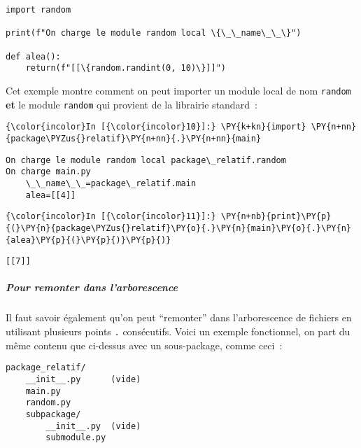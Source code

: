     \begin{Verbatim}[commandchars=\\\{\}]
import random

print(f"On charge le module random local \{\_\_name\_\_\}")

def alea():
    return(f"[[\{random.randint(0, 10)\}]]")

    \end{Verbatim}

    Cet exemple montre comment on peut importer un module local de nom
\texttt{random} \textbf{et} le module \texttt{random} qui provient de la
librairie standard~:

    \begin{Verbatim}[commandchars=\\\{\}]
{\color{incolor}In [{\color{incolor}10}]:} \PY{k+kn}{import} \PY{n+nn}{package\PYZus{}relatif}\PY{n+nn}{.}\PY{n+nn}{main}
\end{Verbatim}


    \begin{Verbatim}[commandchars=\\\{\}]
On charge le module random local package\_relatif.random
On charge main.py
    \_\_name\_\_=package\_relatif.main
    alea=[[4]]

    \end{Verbatim}

    \begin{Verbatim}[commandchars=\\\{\}]
{\color{incolor}In [{\color{incolor}11}]:} \PY{n+nb}{print}\PY{p}{(}\PY{n}{package\PYZus{}relatif}\PY{o}{.}\PY{n}{main}\PY{o}{.}\PY{n}{alea}\PY{p}{(}\PY{p}{)}\PY{p}{)}
\end{Verbatim}


    \begin{Verbatim}[commandchars=\\\{\}]
[[7]]

    \end{Verbatim}

    \hypertarget{pour-remonter-dans-larborescence}{%
\subparagraph{Pour remonter dans
l'arborescence}\label{pour-remonter-dans-larborescence}}

    Il faut savoir également qu'on peut ``remonter'' dans l'arborescence de
fichiers en utilisant plusieurs points \texttt{.} consécutifs. Voici un
exemple fonctionnel, on part du même contenu que ci-dessus avec un
sous-package, comme ceci~:

    \begin{verbatim}
package_relatif/
    __init__.py      (vide)
    main.py
    random.py
    subpackage/
        __init__.py  (vide)
        submodule.py
\end{verbatim}

